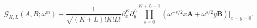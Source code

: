 \begin{equation}               \label{eq:G}
\displaystyle{
\mathcal{G}_{K,L} \left( A, B; \omega^m \right) \equiv
\frac{1}{\sqrt{(K+L)!K!L!}} \partial_x^K  \partial_y^L
  \prod_{s=0}^{K+L-1} \left( \omega^{-s/2} x \mathbf{A} + 
        \omega^{s/2} y \mathbf{B} \right) \vert_{x=y=0}.  
}
\end{equation}

